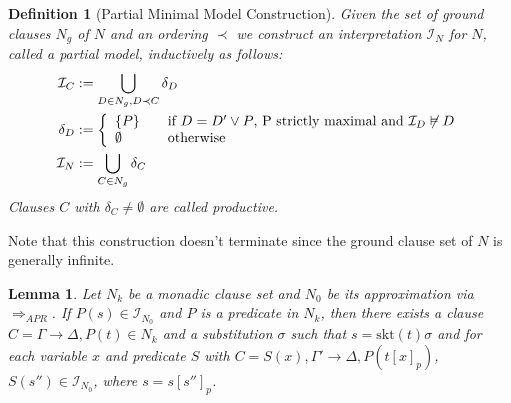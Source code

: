 \documentclass{llncs}
\newcommand{\unsat}{\not \vDash}
\newcommand{\imp}{\rightarrow}
\newcommand{\skt}{\text{skt}}
\newcommand{\apr}{ \Rightarrow_{APR}}
\newcommand{\I}[1]{\mathcal{I}_{#1}}
\newtheorem{defin}{Definition}
\newtheorem{lem}[theorem]{Lemma}
\begin{document}
\begin{defin}[Partial Minimal Model Construction]
Given the set of ground clauses $N_g$ of $N$ and an ordering $\prec$ we construct an interpretation $\I{N}$ for $N$, called a partial model,  inductively as follows:
\begin{align*}
 \I{C} &:= \bigcup_{ D \in N_g,D\prec C} \delta_D\\
 \delta_D &:= \left\{
  \begin{array}{l l}
    \{P\} & \quad \text{if $D=D'\vee P$, P strictly maximal and $\I{D}\unsat D$}\\
    \emptyset & \quad \text{otherwise}
  \end{array} \right. \\
\I{N} &:= \bigcup_{C \in N_g} \delta_C
\end{align*}
Clauses $C$ with $\delta_C \neq \emptyset$ are called productive.
\end{defin}

Note that this construction doesn't terminate since the ground clause set of $N$ is generally infinite.



\begin{lem}\label{termSkelLem3}
Let $N_k$ be a monadic clause set and $N_0$ be its approximation via  $\apr$. 
If $P(s) \in \I{N_0}$  and $P$ is a predicate in $N_k$, then there exists a clause 
$C = \Gamma \imp \Delta,P(t) \in N_k$ and a substitution $\sigma$ such that
$s = \skt(t)\sigma$ and for each variable $x$ and predicate $S$ with $C = S(x),\Gamma' \imp \Delta,P(t[x]_p)$, $S(s'') \in \I{N_0}$, where $s=s[s'']_p$.
\end{lem}
\end{document}

